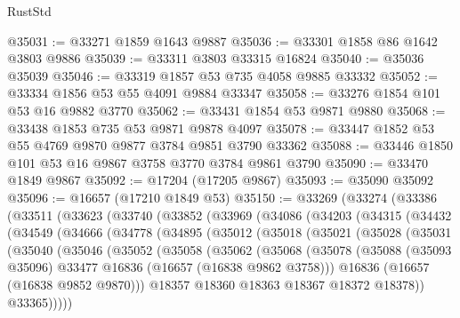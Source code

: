 \begin{lexlean}{RustStd}
\begin{coremodule}
@35031 := @33271 @1859 @1643 @9887
@35036 := @33301 @1858 @86 @1642 @3803 @9886
@35039 := @33311 @3803 @33315 @16824
@35040 := @35036 @35039
@35046 := @33319 @1857 @53 @735 @4058 @9885 @33332
@35052 := @33334 @1856 @53 @55 @4091 @9884 @33347
@35058 := @33276 @1854 @101 @53 @16 @9882 @3770
@35062 := @33431 @1854 @53 @9871 @9880
@35068 := @33438 @1853 @735 @53 @9871 @9878 @4097
@35078 := @33447 @1852 @53 @55 @4769 @9870 @9877 @3784 @9851 @3790 @33362
@35088 := @33446 @1850 @101 @53 @16 @9867 @3758 @3770 @3784 @9861 @3790
@35090 := @33470 @1849 @9867
@35092 := @17204 (@17205 @9867)
@35093 := @35090 @35092
@35096 := @16657 (@17210 @1849 @53)
@35150 := @33269
    (@33274
      (@33386
        (@33511
          (@33623
            (@33740
              (@33852
                (@33969
                  (@34086
                    (@34203
                      (@34315
                        (@34432
                          (@34549
                            (@34666
                              (@34778
                                (@34895
                                  (@35012
                                    (@35018
                                      (@35021
                                        (@35028
                                          (@35031
                                            (@35040
                                              (@35046
                                                (@35052
                                                  (@35058
                                                    (@35062
                                                      (@35068
                                                        (@35078
                                                          (@35088
                                                            (@35093 @35096)
                                                            @33477
                                                            @16836
                                                            (@16657 (@16838 @9862 @3758)))
                                                          @16836
                                                          (@16657 (@16838 @9852 @9870)))
                                                        @18357
                                                        @18360
                                                        @18363
                                                        @18367
                                                        @18372
                                                        @18378))
                                                    @33365)))))

\end{coremodule}
\end{lexlean}
